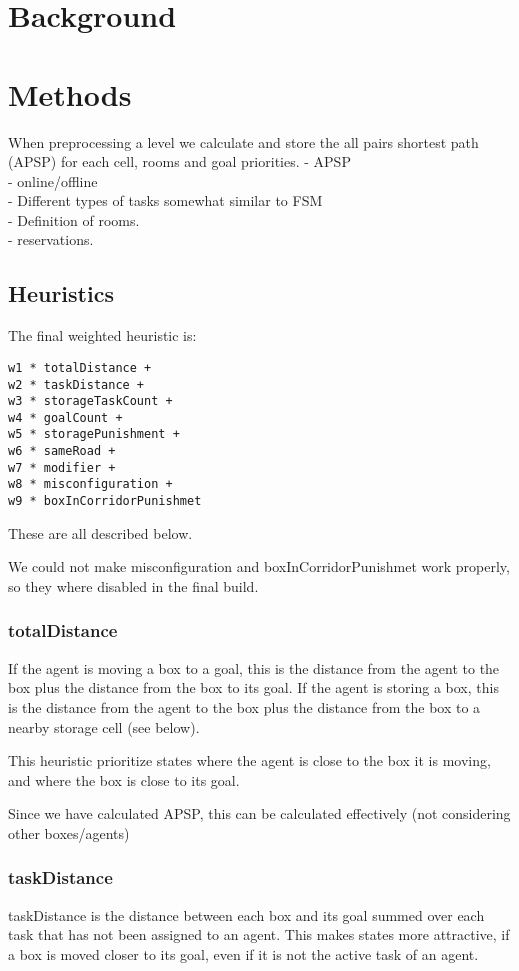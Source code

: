 \documentclass[letterpaper]{article}
\begin{document}
\section{Background}
\section{Methods}
When preprocessing a level we calculate and store the all pairs shortest path (APSP)
for each cell, rooms and goal priorities.
- APSP\\
- online/offline\\
- Different types of tasks somewhat similar to FSM\\
- Definition of rooms.\\
- reservations.\\
\subsection{Heuristics}
The final weighted heuristic is:
\begin{verbatim}
w1 * totalDistance +
w2 * taskDistance +
w3 * storageTaskCount +
w4 * goalCount +
w5 * storagePunishment +
w6 * sameRoad +
w7 * modifier +
w8 * misconfiguration +
w9 * boxInCorridorPunishmet
\end{verbatim}
These are all described below.

We could not make misconfiguration and boxInCorridorPunishmet
work properly, so they where disabled in the final build.
\subsubsection{totalDistance}
If the agent is moving a box to a goal, this is the distance from the agent
to the box plus the distance from the box to its goal. If the agent is storing
a box, this is the distance from the agent to the box plus the distance from the
box to a nearby storage cell (see below).

This heuristic prioritize states where the agent is close to the box it is moving,
and where the box is close to its goal.

Since we have calculated APSP, this can be calculated effectively (not considering other boxes/agents)\\

\subsubsection{taskDistance}
taskDistance is the distance between each box and its goal summed over each task
that has not been assigned to an agent. This makes states more attractive, if
a box is moved closer to its goal, even if it is not the active task of an agent.
\end{document}
